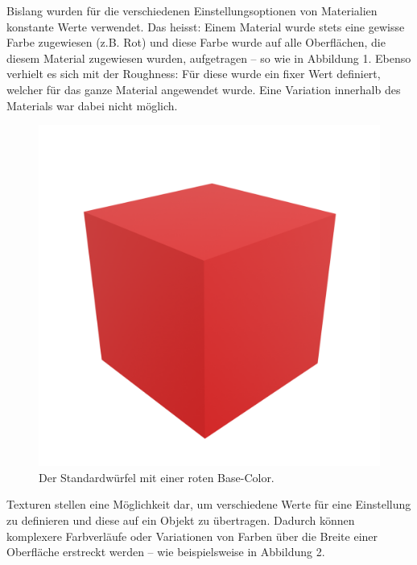 \documentclass[
]{book}
\let\oldmarginnote\marginnote
\renewcommand{\marginnote}[1]{%
  \oldmarginnote{{\footnotesize\selectfont #1}}%
}
\begin{document}
\marginnote{Parameter}

Bislang wurden für die verschiedenen Einstellungsoptionen von
Materialien konstante Werte verwendet. Das heisst: Einem Material wurde
stets eine gewisse Farbe zugewiesen (z.B. Rot) und diese Farbe wurde auf
alle Oberflächen, die diesem Material zugewiesen wurden, aufgetragen --
so wie in Abbildung 1. Ebenso verhielt es sich mit der Roughness: Für
diese wurde ein fixer Wert definiert, welcher für das ganze Material
angewendet wurde. Eine Variation innerhalb des Materials war dabei nicht
möglich.

\begin{figure}

\includegraphics{Chapters/Images/Chapter_21/21_1_Red_Cube.png}

\caption{\label{fig-1_1}Der Standardwürfel mit einer roten Base-Color.}

\end{figure}%

\marginnote{Texturen}

Texturen stellen eine Möglichkeit dar, um verschiedene Werte für eine
Einstellung zu definieren und diese auf ein Objekt zu übertragen.
Dadurch können komplexere Farbverläufe oder Variationen von Farben über
die Breite einer Oberfläche erstreckt werden -- wie beispielsweise in
Abbildung 2.
\end{document}
